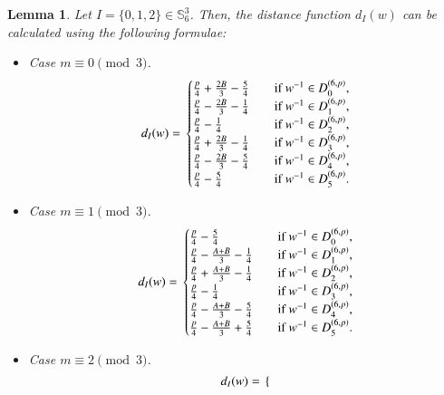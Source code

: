 \documentclass[letter]{ieice}
\newtheorem{sec3_lemma3}[sec3_lemma1]{Lemma}
\begin{document}
\begin{sec3_lemma3}\label{sec3-lamma3-label}
Let $ I=\lbrace0,1,2\rbrace \in  \mathbb{S}_{6}^{3}$. Then, the distance function $ d_{I}(w) $ can be calculated using the following formulae:
\begin{itemize}
\item Case $ m\equiv 0 \pmod 3 $.
\begin{equation*}
d_{I}(w)=\\                  
\begin{cases}
\frac{p}{4}+\frac{2B}{3}-\frac{5}{4}&\quad \mbox{if}\ w^{-1} \in  D_{0}^{(6,p)},\\
\frac{p}{4}-\frac{2B}{3}-\frac{1}{4}&\quad \mbox{if}\ w^{-1} \in  D_{1}^{(6,p)},\\
\frac{p}{4}-\frac{1}{4}&\quad \mbox{if}\ w^{-1} \in  D_{2}^{(6,p)},\\
\frac{p}{4}+\frac{2B}{3}-\frac{1}{4}&\quad \mbox{if}\ w^{-1} \in  D_{3}^{(6,p)},\\
\frac{p}{4}-\frac{2B}{3}-\frac{5}{4}&\quad \mbox{if}\ w^{-1} \in  D_{4}^{(6,p)},\\
\frac{p}{4}-\frac{5}{4}&\quad \mbox{if}\ w^{-1} \in  D_{5}^{(6,p)}.
\end{cases}
\end{equation*}
\item Case $ m\equiv 1 \pmod 3 $.
\begin{equation*}
d_{I}(w)=\\                  
\begin{cases}
\frac{p}{4}-\frac{5}{4}&\quad \mbox{if}\ w^{-1} \in  D_{0}^{(6,p)},\\
\frac{p}{4}-\frac{A+B}{3}-\frac{1}{4}&\quad \mbox{if}\ w^{-1} \in  D_{1}^{(6,p)},\\
\frac{p}{4}+\frac{A+B}{3}-\frac{1}{4}&\quad \mbox{if}\ w^{-1} \in  D_{2}^{(6,p)},\\
\frac{p}{4}-\frac{1}{4}&\quad \mbox{if}\ w^{-1} \in  D_{3}^{(6,p)},\\
\frac{p}{4}-\frac{A+B}{3}-\frac{5}{4}&\quad \mbox{if}\ w^{-1} \in  D_{4}^{(6,p)},\\
\frac{p}{4}-\frac{A+B}{3}+\frac{5}{4}&\quad \mbox{if}\ w^{-1} \in  D_{5}^{(6,p)}.
\end{cases}
\end{equation*}
\item Case $ m\equiv 2 \pmod 3 $.
\begin{equation*}
d_{I}(w)=\\                  
\begin{cases}

\end{cases}
\end{equation*}
\end{itemize}
\end{sec3_lemma3}
\end{document}
